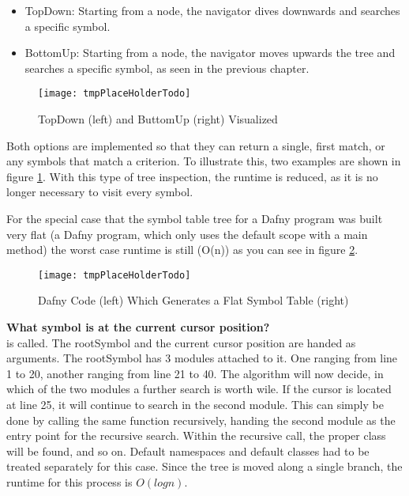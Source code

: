 \begin{itemize}
\item TopDown: Starting from a node, the navigator dives downwards and searches a specific symbol.
\item BottomUp: Starting from a node, the navigator moves upwards the tree and searches a specific symbol, as seen in the previous chapter.
\end{itemize}

\begin{figure}[H]
    \centering
    \texttt{[image: tmpPlaceHolderTodo]}
    \caption{TopDown (left) and ButtomUp (right) Visualized}
    \label{fig:impl_symboltablenav}
\end{figure}

Both options are implemented so that they can return a single, first match, or any symbols that match a criterion.
To illustrate this, two examples are shown in figure \ref{fig:impl_symboltablenav}.
With this type of tree inspection, the runtime is reduced, as it is no longer necessary to visit every symbol.

For the special case that the symbol table tree for a Dafny program was built very flat
(a Dafny program, which only uses the default scope with a main method)
the worst case runtime is still \code(O(n)) as you can see in figure \ref{fig:impl_symboltablenav_o_of_n}.

\begin{figure}[H]
    \centering
    \texttt{[image: tmpPlaceHolderTodo]}
    \caption{Dafny Code (left) Which Generates a Flat Symbol Table (right)}
    \label{fig:impl_symboltablenav_o_of_n}
\end{figure}

\textbf{What symbol is at the current cursor position?}\\
 is called.
The rootSymbol and the current cursor position are handed as arguments.
The rootSymbol has 3 modules attached to it.
One ranging from line 1 to 20, another ranging from line 21 to 40.
The algorithm will now decide, in which of the two modules a further search is worth wile.
If the cursor is located at line 25, it will continue to search in the second module.
This can simply be done by calling the same function recursively, handing the second module as the entry point for the recursive search.
Within the recursive call, the proper class will be found, and so on.
Default namespaces and default classes had to be treated separately for this case.
Since the tree is moved along a single branch, the runtime for this process is $O(logn)$.\\

